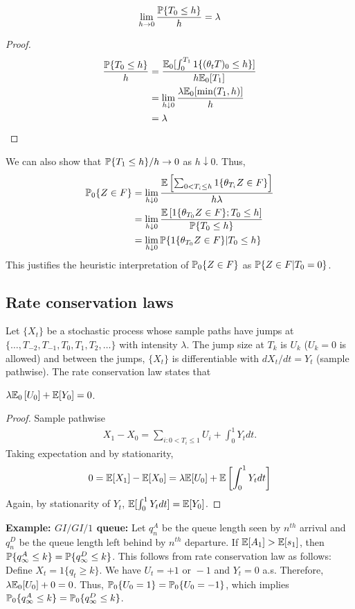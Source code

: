 \documentclass[all-lectures.tex]{subfiles}
\begin{document}
\begin{lem}
\begin{align*}
\lim_{h \to 0} \frac{\P\{T_0 \leq h\}}{h} &= \lambda \\
\end{align*}
\begin{proof}
\begin{align*}
\vspace{-20mm}
\frac{\P\{T_0 \leq h\}}{h} &=  \frac{\E_0[ \int_{0}^{T_1} 1\{(\theta_t T)_0 \leq h\}]}{h \E_0[T_1]} \\
&= \lim_{h \downarrow 0} \frac{\lambda \E_0[ \min(T_1,h) ]}{h} \\
&= \lambda \qedhere
\end{align*}
\end{proof}
\end{lem}
We can also show that $\P\{T_1 \leq h\}/h \to 0$ as $h \downarrow 0$. Thus, 
\begin{align*}
\P_0\{Z \in F\} &= \lim_{h \downarrow 0} \frac{\E\left[ \sum_{0<T_i \leq h} 1\{\theta_{T_i} Z \in F\}\right]}{h \lambda} \\
&= \lim_{h \downarrow 0} \frac{\E\left[ 1\{\theta_{T_0} Z \in F\}; T_0 \leq h\right]}{\P\{T_0 \leq h\}} \\
&= \lim_{h \downarrow 0} \P\{ 1\{\theta_{T_0} Z \in F\}| T_0 \leq h\}
\end{align*}
This justifies the heuristic interpretation of $\P_0\{Z \in F\}$ as $\P\{Z \in F| T_0 = 0\}$.
\subsection{Rate conservation laws}
Let $\{X_t\}$ be a stochastic process whose sample paths have jumps at $\{\dots,T_{-2},T_{-1},T_0,T_1,T_2,\dots\}$ with intensity $\lambda$. The jump size at $T_k$ is $U_k$ ($U_k =0$ is allowed) and between the jumps, $\{X_t\}$ is differentiable with $dX_t/dt = Y_t$ (sample pathwise). The rate conservation law states that
\begin{prop} $\lambda \E_0\left[U_0 \right] + \E[Y_0] = 0$.
\begin{proof}
Sample pathwise 
\begin{align*}
X_1 - X_0 = \sum_{i: 0<T_i \leq 1} U_i + \int_0^1 Y_t dt.
\end{align*}
Taking expectation and by stationarity,
\begin{align*}
0 = \E[X_1]  - \E[X_0] = \lambda \E[U_0] + \E\left[\int_0^1 Y_t dt\right]
\end{align*}
Again, by stationarity of $Y_t$, $\E[\int_0^1 Y_t dt] = \E[Y_0]$.
\end{proof}
\end{prop}
\indent \textbf{Example: $GI/GI/1$ queue:} Let $q^A_n$ be the queue length seen by $n^{th}$ arrival and $q_n^D$ be the queue length left behind by $n^{th}$ departure. If $\E[A_1] > \E[s_1]$, then $\P\{q^A_\infty \leq k\} = \P\{q^D_\infty \leq  k\}$. This follows from rate conservation law as follows: Define $X_t = 1\{q_t \geq k\}$. We have $U_t = +1 \text{ or } -1$ and $Y_t = 0$ a.s. Therefore, $\lambda \E_0[U_0] + 0 = 0$. Thus, $\P_0\{U_0 = 1\} = \P_0\{U_0 = -1\}$, which implies $\P_0\{q^A_\infty \leq k \} = \P_0\{q^D_\infty \leq k\}$.
\end{document}

